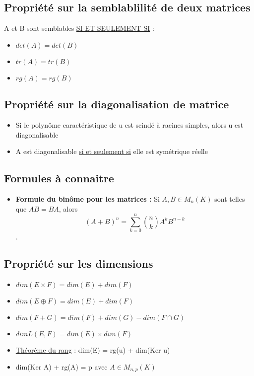 \documentclass{article}
\begin{document}
\subsection{Propriété sur la semblablilité de deux matrices}
A et B sont semblables \underline{SI ET SEULEMENT SI} : 
\begin{itemize}[label=$\ast$]
	\item \( det(A) = det(B) \)
	\item \( tr(A) = tr(B) \)
	\item \( rg(A) = rg(B) \)
\end{itemize}

\subsection{Propriété sur la diagonalisation de matrice}
\begin{itemize}[label=$\ast$]
	\item Si le polynôme caractéristique de u est scindé à racines simples, alors u est diagonalisable
	\item A est diagonalisable \underline{si et seulement si} elle est symétrique réelle
\end{itemize}


\subsection{Formules à connaitre}
\begin{itemize}[label=$\ast$]
	\item \textbf{Formule du binôme pour les matrices :} Si \( A, B \in M_n(K) \) sont telles que \( AB = BA \), alors \[ (A + B)^n = \sum_{k=0}^{n} \binom{n}{k} A^k B^{n-k} \].

\end{itemize}

\subsection{Propriété sur les dimensions}
\begin{itemize}[label=$\ast$]
	\item \( dim(E \times F) = dim(E) + dim(F) \)
	\item \( dim(E \oplus F) = dim(E) + dim(F) \)
	\item \( dim(F + G) = dim(F) + dim(G) - dim(F \cap G) \)
	\item \(dim L(E,F) = dim(E) \times dim(F) \)
	\item \underline{Théorème du rang} : dim(E)  = rg(u) + dim(Ker u)
	\item dim(Ker A) + rg(A) = p avec \(A \in M_{n,p}(K)\)
\end{itemize}
\end{document}
